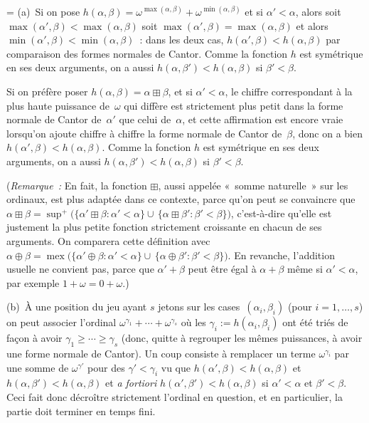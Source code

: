 \documentclass[12pt,a4paper]{article}
\theoremstyle{definition}
\newcommand{\mex}{\operatorname{mex}}
\newif\ifcorrige
\newenvironment{corrige}%
{\ifcorrige\relax\else\setbox0=\vbox\bgroup\fi%
\smallbreak\noindent{\underbar{\textit{Corrigé.}}\quad}}
{{\hbox{}\nobreak\hfill\checkmark}%
\ifcorrige\relax\else\egroup\fi\par}
\begin{document}
\begin{corrige}
(a) Si on pose $h(\alpha,\beta) = \omega^{\max(\alpha,\beta)} +
  \omega^{\min(\alpha,\beta)}$ et si $\alpha' < \alpha$, alors soit
  $\max(\alpha',\beta) < \max(\alpha,\beta)$ soit $\max(\alpha',\beta)
  = \max(\alpha,\beta)$ et alors $\min(\alpha',\beta) <
  \min(\alpha,\beta)$ : dans les deux cas, $h(\alpha',\beta) <
  h(\alpha,\beta)$ par comparaison des formes normales de Cantor.
  Comme la fonction $h$ est symétrique en ses deux arguments, on a
  aussi $h(\alpha,\beta') < h(\alpha,\beta)$ si $\beta' < \beta$.

Si on préfère poser $h(\alpha,\beta) = \alpha\boxplus\beta$, et si
$\alpha' < \alpha$, le chiffre correspondant à la plus haute puissance
de $\omega$ qui diffère est strictement plus petit dans la forme
normale de Cantor de $\alpha'$ que celui de $\alpha$, et cette
affirmation est encore vraie lorsqu'on ajoute chiffre à chiffre la
forme normale de Cantor de $\beta$, donc on a bien $h(\alpha',\beta) <
h(\alpha,\beta)$.  Comme la fonction $h$ est symétrique en ses deux
arguments, on a aussi $h(\alpha,\beta') < h(\alpha,\beta)$ si $\beta'
< \beta$.

{\footnotesize
(\emph{Remarque :} En fait, la fonction $\boxplus$, aussi appelée
« somme naturelle » sur les ordinaux, est plus adaptée dans ce
contexte, parce qu'on peut se convaincre que $\alpha \boxplus \beta =
\sup^+ \big( \{\alpha'\boxplus\beta : \alpha' < \alpha\} \cup\,
\{\alpha\boxplus\beta' : \beta' < \beta\}\big)$, c'est-à-dire qu'elle
est justement la plus petite fonction strictement croissante en chacun
de ses arguments.  On comparera cette définition avec $\alpha \oplus
\beta = \mex \big( \{\alpha'\oplus\beta : \alpha' < \alpha\} \cup\,
\{\alpha\oplus\beta' : \beta' < \beta\}\big)$.  En revanche,
l'addition usuelle ne convient pas, parce que $\alpha'+\beta$ peut
être égal à $\alpha+\beta$ même si $\alpha'<\alpha$, par exemple
$1+\omega = 0+\omega$.)
\par}

(b) À une position du jeu ayant $s$ jetons sur les
cases $(\alpha_i,\beta_i)$ (pour $i=1,\ldots,s$) on peut associer
l'ordinal $\omega^{\gamma_1} + \cdots + \omega^{\gamma_s}$ où les
$\gamma_i := h(\alpha_i,\beta_i)$ ont été triés de façon à avoir
$\gamma_1 \geq \cdots \geq \gamma_s$ (donc, quitte à regrouper les
mêmes puissances, à avoir une forme normale de Cantor).  Un coup
consiste à remplacer un terme $\omega^{\gamma_i}$ par une somme de
$\omega^{\gamma'}$ pour des $\gamma' < \gamma_i$ vu que
$h(\alpha',\beta) < h(\alpha,\beta)$ et $h(\alpha,\beta') <
h(\alpha,\beta)$ et \textit{a fortiori} $h(\alpha',\beta') <
h(\alpha,\beta)$ si $\alpha'<\alpha$ et $\beta'<\beta$.  Ceci fait
donc décroître strictement l'ordinal en question, et en particulier,
la partie doit terminer en temps fini.
\end{corrige}
\end{document}
